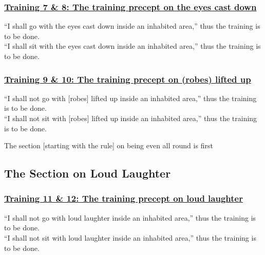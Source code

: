 \subsubsection*{\hyperref[sekh7-8]{Training 7 \& 8: The training precept on the eyes cast down}}
\label{training7-8}
``I shall go with the eyes cast down inside an inhabited area,'' thus the training is to be done.\\
``I shall sit with the eyes cast down inside an inhabited area,'' thus the training is to be done.



\subsubsection*{\hyperref[sekh9-10]{Training 9 \& 10: The training precept on (robes) lifted up}}
\label{training9-10}
``I shall not go with [robes] lifted up inside an inhabited area,'' thus the training is to be done.\\
``I shall not sit with [robes] lifted up inside an inhabited area,'' thus the training is to be done.

\begin{center}
	The section [starting with the rule] on being even all round is first
\end{center}



\setsubsecheadstyle{\subsectionFmt}
\subsection{The Section on Loud Laughter}
\label{trainings-vagga2}

\subsubsection*{\hyperref[sekh11-12]{Training 11 \& 12: The training precept on loud laughter}}
\label{training11-12}
``I shall not go with loud laughter inside an inhabited area,'' thus the training is to be done.\\
``I shall not sit with loud laughter inside an inhabited area,'' thus the training is to be done.



